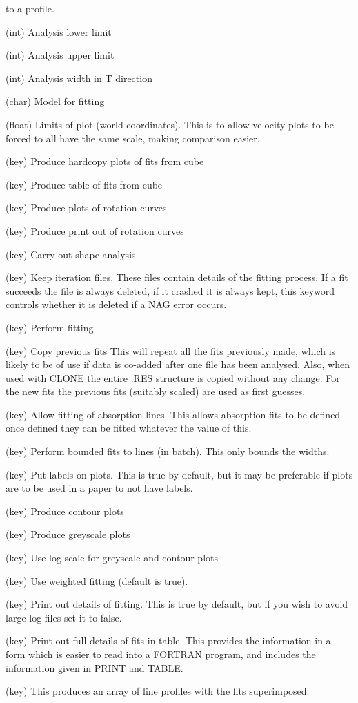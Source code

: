 \begin{description}
to a profile.
\item[TStart] (int) Analysis lower limit
\item[TEnd] (int) Analysis upper limit
\item[TBlock] (int) Analysis width in T direction
\item[FIT\_MODEL] (char) Model for fitting
\item[PLOTLim] (float) Limits of plot (world coordinates).
This is to allow velocity plots to be forced to all have the same scale,
making comparison easier.
\item[HArdcopy] (key) Produce hardcopy plots of fits from cube
\item[TAble] (key) Produce table of fits from cube
\item[PLOT] (key) Produce plots of rotation curves
\item[PRInt] (key) Produce print out of rotation curves
\item[SHape] (key) Carry out shape analysis
\item[KEEP\_ITT] (key) Keep iteration files. These files contain
details of the fitting process. If a fit succeeds the file is always
deleted, if it crashed it is always kept, this keyword controls
whether it is deleted if a NAG error occurs.
\item[FIT] (key) Perform fitting
\item[COPY] (key) Copy previous fits This will repeat all the fits
previously made, which is likely to be of use if data is co-added after
one file has been analysed. Also, when used with CLONE the entire .RES
structure is copied without any change. For the new fits the previous
fits (suitably scaled) are used as first guesses.
\item[ABsorption] (key) Allow fitting of absorption lines.
This allows absorption fits to be defined---once defined they can be
fitted whatever the value of this.
\item[BOunds] (key) Perform bounded fits to lines (in batch).
This only bounds the widths.
\item[LAbel] (key) Put labels on plots.
This is true by default, but it may be preferable if plots are to be
used in a paper to not have labels.
\item[CONtour] (key) Produce contour plots
\item[GRey] (key) Produce greyscale plots
\item[LOG] (key) Use log scale for greyscale and contour plots
\item[WEIghts] (key) Use weighted fitting (default is true).
\item[PRFits] (key) Print out details of fitting.
This is true by default, but if you wish to avoid large log files set it
to false.
\item[FULL] (key) Print out full details of fits in table.
This provides the information in a form which is easier to read into a
FORTRAN program, and includes the information given in PRINT and TABLE.
\item[CHECK] (key) This produces an array of line profiles with the fits
superimposed.
\end{description}
